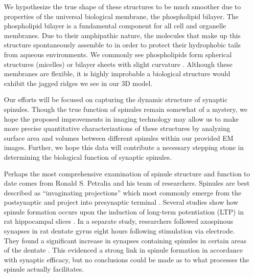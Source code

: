 \documentclass{article}
\begin{document}
We hypothesize the true shape of these structures to be much smoother due to properties of the universal biological membrane, the phospholipid bilayer. The phospholipid bilayer is a fundamental component for all cell and organelle membranes. Due to their amphipathic nature, the molecules that make up this structure spontaneously assemble to in order to protect their hydrophobic tails from aqueous environments. We commonly see phospholipids form spherical structures (micelles) or bilayer sheets with slight curvature \cite{molecularbio}. Although these membranes are flexible, it is highly improbable a biological structure would exhibit the jagged ridges we see in our 3D model.

Our efforts will be focused on capturing the dynamic structure of synaptic spinules. Though the true function of spinules remain somewhat of a mystery, we hope the proposed improvements in imaging technology may allow us to make more precise quantitative characterizations of these structures by analyzing surface area and volumes between different spinules within our provided EM images. Further, we hope this data will contribute a necessary stepping stone in determining the biological function of synaptic spinules.

Perhaps the most comprehensive examination of spinule structure and function to date comes from Ronald S. Petralia and his team of researchers. Spinules are best described as “invaginating projections” which most commonly emerge from the postsynaptic and project into presynaptic terminal \cite{petralia2015structure}. Several studies show how spinule formation occurs upon the induction of long-term potentiation (LTP) in rat hippocampal slices \cite{petralia2015structure}. In a separate study, researchers followed axospinous synapses in rat dentate gyrus eight hours following stimulation via electrode. They found a significant increase in synapses containing spinules in certain areas of the dentate \cite{schuster1990spinules}. This evidenced a strong link in spinule formation in accordance with synaptic efficacy, but no conclusions could be made as to what processes the spinule actually facilitates.
\end{document}
